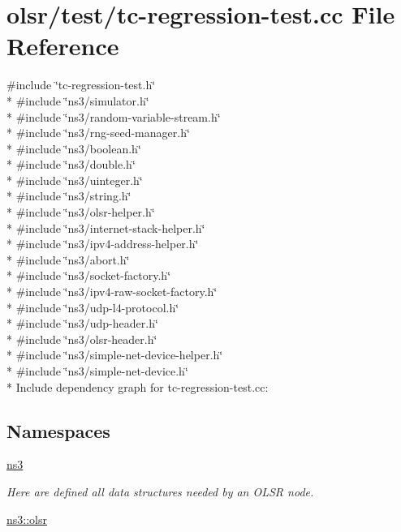 \hypertarget{tc-regression-test_8cc}{}\section{olsr/test/tc-\/regression-\/test.cc File Reference}
\label{tc-regression-test_8cc}
{\ttfamily \#include \char`\"{}tc-\/regression-\/test.\+h\char`\"{}}\\*
{\ttfamily \#include \char`\"{}ns3/simulator.\+h\char`\"{}}\\*
{\ttfamily \#include \char`\"{}ns3/random-\/variable-\/stream.\+h\char`\"{}}\\*
{\ttfamily \#include \char`\"{}ns3/rng-\/seed-\/manager.\+h\char`\"{}}\\*
{\ttfamily \#include \char`\"{}ns3/boolean.\+h\char`\"{}}\\*
{\ttfamily \#include \char`\"{}ns3/double.\+h\char`\"{}}\\*
{\ttfamily \#include \char`\"{}ns3/uinteger.\+h\char`\"{}}\\*
{\ttfamily \#include \char`\"{}ns3/string.\+h\char`\"{}}\\*
{\ttfamily \#include \char`\"{}ns3/olsr-\/helper.\+h\char`\"{}}\\*
{\ttfamily \#include \char`\"{}ns3/internet-\/stack-\/helper.\+h\char`\"{}}\\*
{\ttfamily \#include \char`\"{}ns3/ipv4-\/address-\/helper.\+h\char`\"{}}\\*
{\ttfamily \#include \char`\"{}ns3/abort.\+h\char`\"{}}\\*
{\ttfamily \#include \char`\"{}ns3/socket-\/factory.\+h\char`\"{}}\\*
{\ttfamily \#include \char`\"{}ns3/ipv4-\/raw-\/socket-\/factory.\+h\char`\"{}}\\*
{\ttfamily \#include \char`\"{}ns3/udp-\/l4-\/protocol.\+h\char`\"{}}\\*
{\ttfamily \#include \char`\"{}ns3/udp-\/header.\+h\char`\"{}}\\*
{\ttfamily \#include \char`\"{}ns3/olsr-\/header.\+h\char`\"{}}\\*
{\ttfamily \#include \char`\"{}ns3/simple-\/net-\/device-\/helper.\+h\char`\"{}}\\*
{\ttfamily \#include \char`\"{}ns3/simple-\/net-\/device.\+h\char`\"{}}\\*
Include dependency graph for tc-\/regression-\/test.cc\+:
\subsection*{Namespaces}
\begin{DoxyCompactItemize}
\item 
 \hyperlink{namespacens3}{ns3}
\begin{DoxyCompactList}\small\item\em Here are defined all data structures needed by an O\+L\+SR node. \end{DoxyCompactList}\item 
 \hyperlink{namespacens3_1_1olsr}{ns3\+::olsr}
\end{DoxyCompactItemize}
